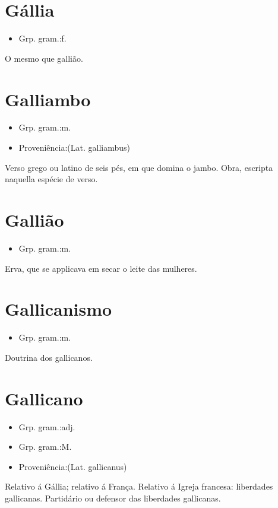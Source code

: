 \section{Gállia}
\begin{itemize}
\item {Grp. gram.:f.}
\end{itemize}
O mesmo que \textunderscore gallião\textunderscore .
\section{Galliambo}
\begin{itemize}
\item {Grp. gram.:m.}
\end{itemize}
\begin{itemize}
\item {Proveniência:(Lat. \textunderscore galliambus\textunderscore )}
\end{itemize}
Verso grego ou latino de seis pés, em que domina o jambo.
Obra, escripta naquella espécie de verso.
\section{Gallião}
\begin{itemize}
\item {Grp. gram.:m.}
\end{itemize}
Erva, que se applicava em secar o leite das mulheres.
\section{Gallicanismo}
\begin{itemize}
\item {Grp. gram.:m.}
\end{itemize}
Doutrina dos gallicanos.
\section{Gallicano}
\begin{itemize}
\item {Grp. gram.:adj.}
\end{itemize}
\begin{itemize}
\item {Grp. gram.:M.}
\end{itemize}
\begin{itemize}
\item {Proveniência:(Lat. \textunderscore gallicanus\textunderscore )}
\end{itemize}
Relativo á Gállia; relativo á França.
Relativo á Igreja francesa: \textunderscore liberdades gallicanas\textunderscore .
Partidário ou defensor das liberdades gallicanas.
